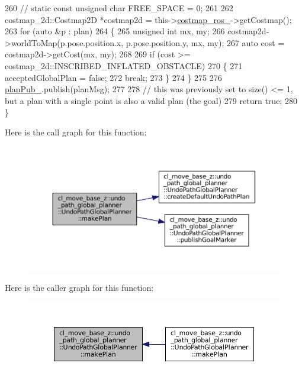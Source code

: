 \begin{DoxyCode}
260             \textcolor{comment}{// static const unsigned char FREE\_SPACE = 0;}
261 
262             costmap\_2d::Costmap2D *costmap2d = this->\hyperlink{classcl__move__base__z_1_1undo__path__global__planner_1_1UndoPathGlobalPlanner_ab63eeb465e3ae989a6edcc4d059cf8f0}{costmap\_ros\_}->getCostmap();
263             \textcolor{keywordflow}{for} (\textcolor{keyword}{auto} &p : plan)
264             \{
265                 \textcolor{keywordtype}{unsigned} \textcolor{keywordtype}{int} mx, my;
266                 costmap2d->worldToMap(p.pose.position.x, p.pose.position.y, mx, my);
267                 \textcolor{keyword}{auto} cost = costmap2d->getCost(mx, my);
268 
269                 \textcolor{keywordflow}{if} (cost >= costmap\_2d::INSCRIBED\_INFLATED\_OBSTACLE)
270                 \{
271                     acceptedGlobalPlan = \textcolor{keyword}{false};
272                     \textcolor{keywordflow}{break};
273                 \}
274             \}
275 
276             \hyperlink{classcl__move__base__z_1_1undo__path__global__planner_1_1UndoPathGlobalPlanner_a65bf364a122d5950baf1bf8b42309d68}{planPub\_}.publish(planMsg);
277 
278             \textcolor{comment}{// this was previously set to size() <= 1, but a plan with a single point is also a valid plan
       (the goal)}
279             \textcolor{keywordflow}{return} \textcolor{keyword}{true};
280         \}
\end{DoxyCode}
Here is the call graph for this function\+:
\nopagebreak
\begin{figure}[H]
\begin{center}
\leavevmode
\includegraphics[width=350pt]{classcl__move__base__z_1_1undo__path__global__planner_1_1UndoPathGlobalPlanner_a46034d27c0811abae440009457a7f8b0_cgraph}
\end{center}
\end{figure}
Here is the caller graph for this function\+:
\nopagebreak
\begin{figure}[H]
\begin{center}
\leavevmode
\includegraphics[width=350pt]{classcl__move__base__z_1_1undo__path__global__planner_1_1UndoPathGlobalPlanner_a46034d27c0811abae440009457a7f8b0_icgraph}
\end{center}
\end{figure}
